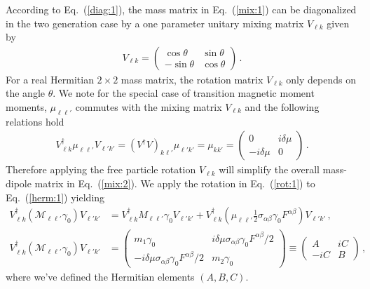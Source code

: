 \documentclass[addchapnum]{ws-rv961x669} %
\newcommand{\req}[1]{Eq.~(\ref{#1})}
\begin{document}
According to \req{diag:1}, the mass matrix in \req{mix:1} can be diagonalized in the two generation case by a one parameter unitary mixing matrix $V_{\ell k}$ given by
\begin{align}
    \label{rot:1}
    V_{\ell k}=
    \begin{pmatrix}
        \cos\theta & \sin\theta\\
        -\sin\theta & \cos\theta
    \end{pmatrix}\,.
\end{align}
For a real Hermitian $2\times 2$ mass matrix, the rotation matrix $V_{\ell k}$ only depends on the angle $\theta$. We note for the special case of transition magnetic moment moments, $\mu_{\ell\ell'}$ commutes with the mixing matrix $V_{\ell k}$ and the following relations hold
\begin{align}
    V_{\ell k}^{\dag}\mu_{\ell\ell'}V_{\ell' k'}=(V^{\dag}V)_{k\ell'}\mu_{\ell'k'}=\mu_{kk'}=
    \begin{pmatrix}
        0 & i\delta\mu\\
        -i\delta\mu & 0
    \end{pmatrix}\,.
\end{align}
Therefore applying the free particle rotation $V_{\ell k}$ will simplify the overall mass-dipole matrix in \req{mix:2}. We apply the rotation in \req{rot:1} to \req{herm:1} yielding
\begin{align}
    \label{herm:2}
    V_{\ell k}^{\dag}(\mathcal{M}_{\ell\ell'}\gamma_{0})V_{\ell' k'} &= 
    V_{\ell k}^{\dag}M_{\ell\ell'}\gamma_{0}V_{\ell' k'} +
    V_{\ell k}^{\dag}(\mu_{\ell\ell'}\frac{1}{2}\sigma_{\alpha\beta}\gamma_{0}F^{\alpha\beta})V_{\ell' k'}\,,\\
    \label{herm:3}
    V_{\ell k}^{\dag}(\mathcal{M}_{\ell\ell'}\gamma_{0})V_{\ell' k'} &= 
	\begin{pmatrix}
        m_{1}\gamma_{0} & i\delta\mu\sigma_{\alpha\beta}\gamma_{0}F^{\alpha\beta}/2\\
        -i\delta\mu\sigma_{\alpha\beta}\gamma_{0}F^{\alpha\beta}/2 & m_{2}\gamma_{0}
	\end{pmatrix}\equiv
    \begin{pmatrix}
        A & iC\\
        -iC & B
    \end{pmatrix}\,,
\end{align}
where we've defined the Hermitian elements $(A,B,C)$.
\end{document}
